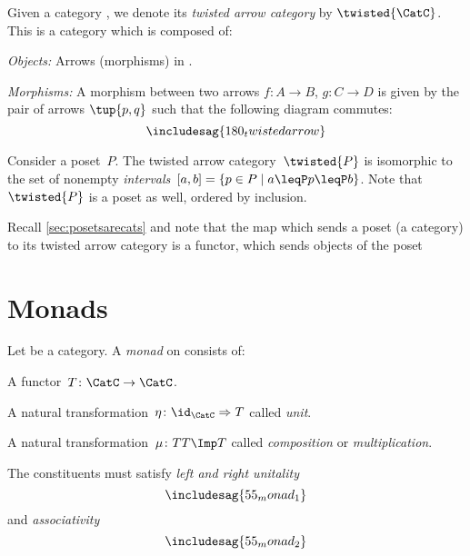 




\begin{ctdefinition}
    Given a category \CatC, we denote its \emph{twisted arrow category} by $\twisted{\CatC}$. This is a category which is composed of:
    \begin{compactenum}
        \item \emph{Objects:} Arrows (morphisms) in \CatC.
        \item \emph{Morphisms:} A morphism between two arrows $f\colon A\to B$, $g\colon C\to D$ is given by the pair of arrows $\tup{p,q}$ such that the following diagram commutes:
        \begin{equation}
            \includesag{180_twistedarrow}
        \end{equation}
    \end{compactenum}
\end{ctdefinition}

\begin{example}[Intervals]
    Consider a poset~$P$. The twisted arrow category~$\twisted{P}$ is isomorphic to the set of nonempty \emph{intervals}~$[a,b]=\{p \in P\mid a\leqP p \leqP b\}$. Note that~$\twisted{P}$ is a poset as well, ordered by inclusion.
\end{example}
\begin{remark}
    Recall \cref{sec:posetsarecats} and note that the map which sends a poset (a category) to its twisted arrow category is a functor, which sends objects of the poset
\end{remark}


\section{Monads}

\begin{ctdefinition}[Monad]
    Let \CatC be a category. A \emph{monad} on \CatC consists of:
    \begin{compactenum}
        \item A functor~$T \colon \CatC \to \CatC$.
        \item A natural transformation~$\eta \colon \id_\CatC \Rightarrow T$ called \emph{unit}.
        \item A natural transformation~$\mu\colon TT\Imp T$ called \emph{composition} or \emph{multiplication}.
    \end{compactenum}
    The constituents must satisfy \emph{left and right unitality}
    \begin{equation}
        \includesag{55_monad_1}
    \end{equation}
    and \emph{associativity}
    \begin{equation}
        \includesag{55_monad_2}
    \end{equation}
\end{ctdefinition}


